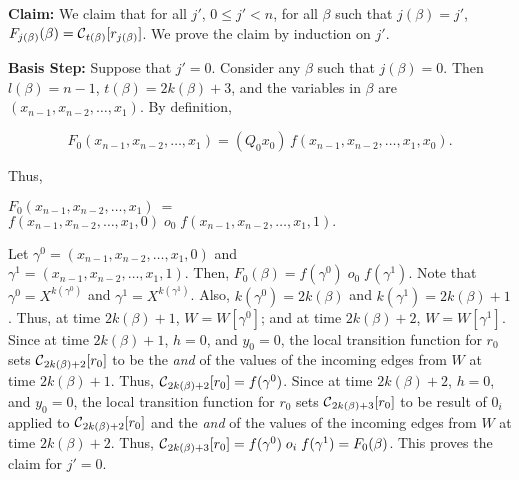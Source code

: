 \smallskip
\noindent
{\bf Claim:} We claim that for all $j'$, $0 \leq j' < n$,
for all $\beta$ such that $j(\beta) = j'$,
$F_{j(\beta)}(\beta) =\mbox{$\mathcal{C}$}_{t(\beta)}[r_{j(\beta)}]$.
We prove the claim by induction on $j'$.

\smallskip
\noindent
{\bf Basis Step:} Suppose that $j' = 0$.
Consider any $\beta$ such that $j(\beta) = 0$.
Then $l(\beta) = n-1$, $t(\beta) = 2k(\beta) + 3$,
and the variables in $\beta$ are $(x_{n-1}, x_{n-2}, \ldots , x_1)$.
By definition,

\smallskip

$$F_0(x_{n-1}, x_{n-2}, \ldots, x_1) 
= (Q_0 x_0) \, f(x_{n-1}, x_{n-2}, \ldots , x_1, x_0).$$

\smallskip

\noindent
Thus,\\ \smallskip

$F_0(x_{n-1}, x_{n-2}, \ldots , x_1) ~=~$ \\
\hspace*{0.1in}
$f(x_{n-1}, x_{n-2}, \ldots , x_1, 0) \; o_0 \; 
f(x_{n-1}, x_{n-2}, \ldots , x_1, 1).$ \\

\smallskip

\noindent
Let $\gamma^0 = (x_{n-1}, x_{n-2}, \ldots , x_1, 0)$ and\\
$\gamma^1 = (x_{n-1}, x_{n-2}, \ldots , x_1, 1)$.
Then, $F_0(\beta) =  
f(\gamma^0) \; o_0 \; f(\gamma^1)$.
Note that $\gamma^0 = X^{k(\gamma^0)}$ and $\gamma^1 = X^{k(\gamma^1)}$.
Also, $k(\gamma^0) = 2k(\beta)$ and $k(\gamma^1) = 2k(\beta)+1$.
Thus, at time $2k(\beta)+1$, $W = W[\gamma^0]$;
and at time $2k(\beta)+2$, $W = W[\gamma^1]$.
Since at time $2k(\beta)+1$, $h=0$, and $y_0 = 0$, 
the local transition function for $r_0$ sets $\mbox{$\mathcal{C}$}_{2k(\beta)+2}[r_0]$ to be 
the {\em and} of the values of the incoming edges from $W$ at time $2k(\beta)+1$.
Thus, $\mbox{$\mathcal{C}$}_{2k(\beta)+2}[r_0] = f(\gamma^0)$.
Since at time $2k(\beta)+2$, $h=0$, and $y_0 = 0$, 
the local transition function for $r_0$ sets $\mbox{$\mathcal{C}$}_{2k(\beta)+3}[r_0]$ to be result of $0_i$
applied to $\mbox{$\mathcal{C}$}_{2k(\beta)+2}[r_0]$ and
the {\em and} of the values of the incoming edges from $W$ at time $2k(\beta)+2$.
Thus, $\mbox{$\mathcal{C}$}_{2k(\beta)+3}[r_0] = f(\gamma^0) \; o_i \; f(\gamma^1) = F_0(\beta)$.
This proves the claim for $j' = 0$.

